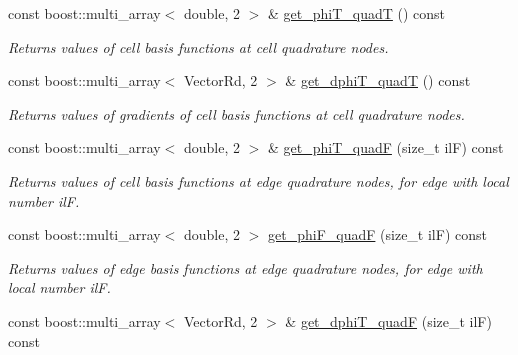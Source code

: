 \begin{DoxyCompactItemize}
const boost\+::multi\+\_\+array$<$ double, 2 $>$ \& \hyperlink{classHArDCore2D_1_1ElementQuad_a87443a1da538a16841f08e5a8c1dd8ee}{get\+\_\+phi\+T\+\_\+quadT} () const
\begin{DoxyCompactList}\small\item\em Returns values of cell basis functions at cell quadrature nodes. \end{DoxyCompactList}\item 
\mbox{\label{classHArDCore2D_1_1ElementQuad_a4962e2d0b866a3016b574f24c0d15940}} 
const boost\+::multi\+\_\+array$<$ Vector\+Rd, 2 $>$ \& \hyperlink{classHArDCore2D_1_1ElementQuad_a4962e2d0b866a3016b574f24c0d15940}{get\+\_\+dphi\+T\+\_\+quadT} () const
\begin{DoxyCompactList}\small\item\em Returns values of gradients of cell basis functions at cell quadrature nodes. \end{DoxyCompactList}\item 
\mbox{\label{classHArDCore2D_1_1ElementQuad_ab8d725c09a9086bfe42688d0f34d1669}} 
const boost\+::multi\+\_\+array$<$ double, 2 $>$ \& \hyperlink{classHArDCore2D_1_1ElementQuad_ab8d725c09a9086bfe42688d0f34d1669}{get\+\_\+phi\+T\+\_\+quadF} (size\+\_\+t ilF) const
\begin{DoxyCompactList}\small\item\em Returns values of cell basis functions at edge quadrature nodes, for edge with local number ilF. \end{DoxyCompactList}\item 
\mbox{\label{classHArDCore2D_1_1ElementQuad_a0289327a67759deb2c311e75d4f6ce55}} 
const boost\+::multi\+\_\+array$<$ double, 2 $>$ \hyperlink{classHArDCore2D_1_1ElementQuad_a0289327a67759deb2c311e75d4f6ce55}{get\+\_\+phi\+F\+\_\+quadF} (size\+\_\+t ilF) const
\begin{DoxyCompactList}\small\item\em Returns values of edge basis functions at edge quadrature nodes, for edge with local number ilF. \end{DoxyCompactList}\item 
\mbox{\label{classHArDCore2D_1_1ElementQuad_aada65c8bf767b946fe72c466071698f6}} 
const boost\+::multi\+\_\+array$<$ Vector\+Rd, 2 $>$ \& \hyperlink{classHArDCore2D_1_1ElementQuad_aada65c8bf767b946fe72c466071698f6}{get\+\_\+dphi\+T\+\_\+quadF} (size\+\_\+t ilF) const

\end{DoxyCompactItemize}
